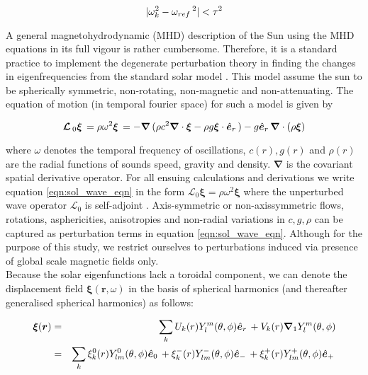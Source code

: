 \begin{equation}
|\omega_k^2 - \omega_{ref}\,^2| < \tau^2
\end{equation}


A general magnetohydrodynamic (MHD) description of the Sun using the MHD equations in its full vigour is rather cumbersome. Therefore, it is a standard practice to implement the degenerate perturbation theory in finding the changes in eigenfrequencies from the standard solar model \cite{ritzwoller,lavely92}. This model assume the sun to be spherically symmetric, non-rotating, non-magnetic and non-attenuating. The equation of motion (in temporal fourier space) for such a model is given by \citep{jcd_notes}

\begin{equation} \label{eqn:sol_wave_eqn}
\bm{\mathcal{L}}\,_0 \bm{\xi}\, = \rho \omega^2 \bm{\xi}\,  = - \bm{\nabla}\, (\rho c^2 \boldsymbol{\nabla} \cdot \boldsymbol{\xi} - \rho g \boldsymbol{\xi} \cdot \hat{\bm{e}}_{r}\,) - g \hat{\bm{e}}_{r}\, \boldsymbol{\nabla} \cdot (\rho \boldsymbol{\xi})
\end{equation}

where $\omega$ denotes the temporal frequency of oscillations, $c(r), g(r)$ and $\rho(r)$ are the radial functions of sounds speed, gravity and density. $\boldsymbol{\nabla}$ is the covariant spatial derivative operator. For all ensuing calculations and derivations we write equation \ref{eqn:sol_wave_eqn} in the form $\mathcal{L}_0 \boldsymbol{\xi} = \rho \omega^2 \boldsymbol{\xi}$ where the unperturbed wave operator $\mathcal{L}_0$ is self-adjoint \cite{goedbloed2004}. Axis-symmetric or non-axissymmetric flows, rotations, asphericities, anisotropies and non-radial variations in $c, g, \rho$ can be captured as perturbation terms in equation \ref{eqn:sol_wave_eqn}. Although for the purpose of this study, we restrict ourselves to perturbations induced via presence of global scale magnetic fields only. 
\\

Because the solar eigenfunctions lack a toroidal component, we can denote the displacement field $\boldsymbol{\xi}(\boldsymbol{r},\omega)$ in the basis of spherical harmonics (and thereafter generalised spherical harmonics) as follows:

\begin{eqnarray} \label{eqn: xi_exp}
    \boldsymbol{\xi}(\boldsymbol{r}) &=& \sum_{k} U_{k}(r) Y_l^m(\theta,\phi) \hat{\bm{e}}_{r}\,
 + V_{k}(r) \boldsymbol{\nabla}_1 Y_l^m(\theta,\phi) \\
     &=& \sum_{k} \xi_{k}^0(r) Y_{lm}^0(\theta,\phi) \hat{\bm{e}}_{0}\, + \xi_{k}^-(r) Y_{lm}^-(\theta,\phi) \hat{\bm{e}}_{-}\, + \xi_{k}^+(r) Y_{lm}^+(\theta,\phi) \hat{\bm{e}}_{+}\,
 \end{eqnarray}
 
